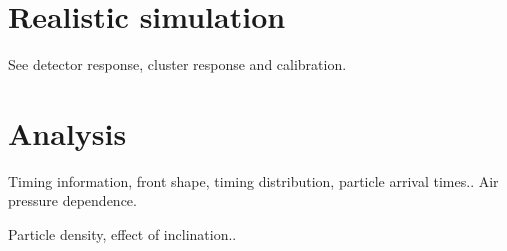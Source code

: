 \section{Realistic simulation}



See detector response, cluster response and calibration.


\section{Analysis}


Timing information, front shape, timing distribution, particle arrival times..
Air pressure dependence.

Particle density, effect of inclination..
